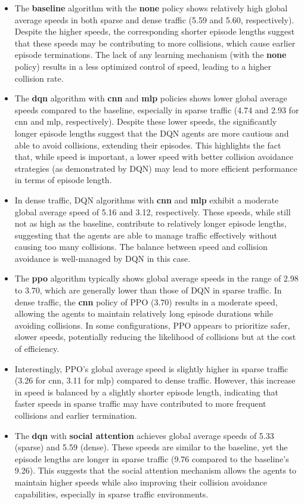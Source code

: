 \begin{itemize}
    \item The \textbf{baseline} algorithm with the \textbf{none} policy shows relatively high global average speeds in both sparse and dense traffic (5.59 and 5.60, respectively). Despite the higher speeds, the corresponding shorter episode lengths suggest that these speeds may be contributing to more collisions, which cause earlier episode terminations. The lack of any learning mechanism (with the \textbf{none} policy) results in a less optimized control of speed, leading to a higher collision rate.
    \item The \textbf{dqn} algorithm with \textbf{cnn} and \textbf{mlp} policies shows lower global average speeds compared to the baseline, especially in sparse traffic (4.74 and 2.93 for cnn and mlp, respectively). Despite these lower speeds, the significantly longer episode lengths suggest that the DQN agents are more cautious and able to avoid collisions, extending their episodes. This highlights the fact that, while speed is important, a lower speed with better collision avoidance strategies (as demonstrated by DQN) may lead to more efficient performance in terms of episode length.
    \item In dense traffic, DQN algorithms with \textbf{cnn} and \textbf{mlp} exhibit a moderate global average speed of 5.16 and 3.12, respectively. These speeds, while still not as high as the baseline, contribute to relatively longer episode lengths, suggesting that the agents are able to manage traffic effectively without causing too many collisions. The balance between speed and collision avoidance is well-managed by DQN in this case.
    \item The \textbf{ppo} algorithm typically shows global average speeds in the range of 2.98 to 3.70, which are generally lower than those of DQN in sparse traffic. In dense traffic, the \textbf{cnn} policy of PPO (3.70) results in a moderate speed, allowing the agents to maintain relatively long episode durations while avoiding collisions. In some configurations, PPO appears to prioritize safer, slower speeds, potentially reducing the likelihood of collisions but at the cost of efficiency.
    \item Interestingly, PPO's global average speed is slightly higher in sparse traffic (3.26 for cnn, 3.11 for mlp) compared to dense traffic. However, this increase in speed is balanced by a slightly shorter episode length, indicating that faster speeds in sparse traffic may have contributed to more frequent collisions and earlier termination.
    \item The \textbf{dqn} with \textbf{social attention} achieves global average speeds of 5.33 (sparse) and 5.59 (dense). These speeds are similar to the baseline, yet the episode lengths are longer in sparse traffic (9.76 compared to the baseline's 9.26). This suggests that the social attention mechanism allows the agents to maintain higher speeds while also improving their collision avoidance capabilities, especially in sparse traffic environments.
\end{itemize}

